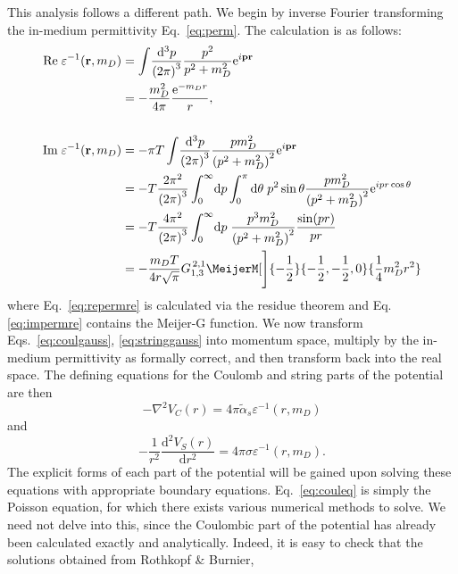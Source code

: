 \documentclass[12pt,a4paper]{article}
\newcommand\MeijerG[8][]{%
  G^{\,#2,#3}_{#4,#5}\MeijerM[#1]{#6}{#7}{#8}}
\begin{document}
This analysis follows a different path. We begin by inverse Fourier transforming the in-medium permittivity Eq.~\eqref{eq:perm}. The calculation is as follows:
\begin{align}
\mathrm{Re}\;\varepsilon^{-1}\!\left(\mathbf{r},m_{D}\right)&=\int\!\frac{\mathrm{d}^3p}{\left(2\pi\right)^3}\frac{p^2}{p^2+m_D^2}\mathrm{e}^{i \mathbf{pr}} \nonumber\\ 
&=-\frac{m_D^2}{4\pi} \frac{\mathrm{e}^{-m_D r}}{r}, \label{eq:repermre} \\
\nonumber\\
\mathrm{Im}\;\varepsilon^{-1}\!\left(\mathbf{r},m_{D}\right)&=-\pi T\int\!\frac{\mathrm{d}^3p}{\left(2\pi\right)^3}\frac{p m_D^2}{\left(p^2+m_D^2\right)^2}\mathrm{e}^{i \mathbf{pr}} \nonumber \\
&=-T\frac{2\pi^2}{\left(2\pi\right)^3}\int_0^\infty\!\mathrm{d}p\int_0^{\pi}\mathrm{d}\theta\;p^2 \sin\theta\frac{p m_D^2}{\left(p^2+m_D^2\right)^2}\mathrm{e}^{ipr\cos\theta} \nonumber\\
&=-T\frac{4\pi^2}{\left(2\pi\right)^3}\int_0^\infty\!\mathrm{d}p\;\frac{p^3 m_D^2}{\left(p^2+m_D^2\right)^2}\frac{\sin\!\left(pr\right)}{pr} \nonumber\\
&=-\frac{m_D T}{4r\sqrt{\pi}}\MeijerG[\Bigg]{2}{1}{1}{3}{-\frac{1}{2}}{-\frac{1}{2},-\frac{1}{2},0}{\frac{1}{4}m_D^2r^2} \label{eq:impermre}
\end{align}
where Eq.~\eqref{eq:repermre} is calculated via the residue theorem and Eq.\eqref{eq:impermre} contains the Meijer-G function. We now transform Eqs.~\eqref{eq:coulgauss}, \eqref{eq:stringgauss} into momentum space, multiply by the in-medium permittivity as formally correct, and then transform back into the real space. The defining equations for the Coulomb and string parts of the potential are then
\begin{equation}
\label{eq:couleq}
-\nabla^2V_{C}\!\left(r\right)=4\pi\tilde{\alpha}_s\varepsilon^{-1}\!\left(r,m_{D}\right)
\end{equation}
and
\begin{equation}
\label{eq:stringeq}
-\frac{1}{r^2}\frac{\mathrm{d}^2V_S\!\left(r\right)}{\mathrm{d}r^2}=4\pi\sigma\varepsilon^{-1}\!\left(r,m_{D}\right).
\end{equation}
The explicit forms of each part of the potential will be gained upon solving these equations with appropriate boundary equations. Eq.~\eqref{eq:couleq} is simply the Poisson equation, for which there exists various numerical methods to solve. We need not delve into this, since the Coulombic part of the potential has already been calculated exactly and analytically. Indeed, it is easy to check that the solutions obtained from Rothkopf \& Burnier,
\end{document}
